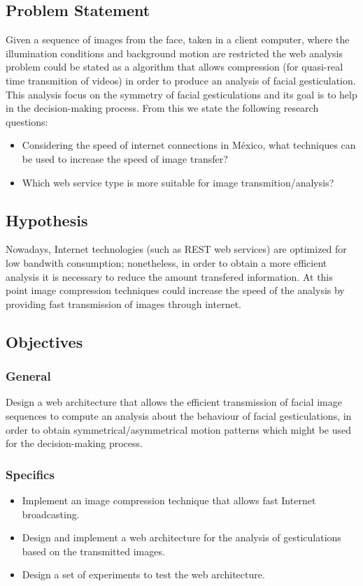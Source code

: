 \documentclass[12pt,letterpaper,titlepage]{article}
\begin{document}
\subsection{Problem Statement}
Given a sequence of images from the face, taken in a client computer, where the illumination conditions and background motion are restricted the web analysis problem could be stated as a algorithm that allows compression (for quasi-real time transmition of videos) in order to produce an analysis of facial gesticulation. This analysis focus on the symmetry of facial gesticulations and its goal is to help in the decision-making process. From this we state the following research questions:
\begin{itemize}
\item Considering the speed of internet connections in M\'exico, what techniques can be used to increase the speed of image transfer?
\item Which web service type is more suitable for image transmition/analysis?
\end{itemize}

\subsection{Hypothesis}

Nowadays, Internet technologies (such as REST web services) are optimized for low bandwith consumption; nonetheless, in order to obtain a more efficient analysis it is necessary to reduce the amount transfered information. At this point image compression techniques could increase the speed of the analysis by providing fast transmission of images through internet.

\subsection{Objectives}
\subsubsection{General}
Design a web architecture that allows the efficient transmission of facial image sequences to compute an analysis about the behaviour of facial gesticulations, in order to obtain symmetrical/asymmetrical motion patterns which might be used for the decision-making process.
\subsubsection{Specifics}
\begin{itemize}
\item Implement an image compression technique that allows fast Internet broadcasting.
\item Design and implement a web architecture for the analysis of gesticulations based on the transmitted images.
\item Design a set of experiments to test the web architecture.
\end{itemize}
\end{document}
